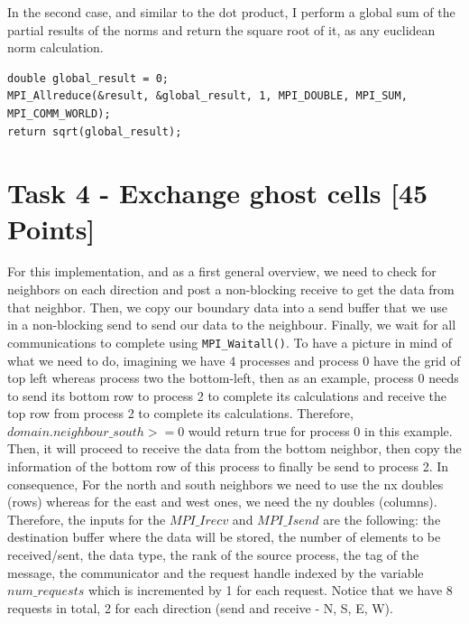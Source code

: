 \documentclass[unicode,11pt,a4paper,oneside,numbers=endperiod,openany]{scrartcl}
\begin{document}
In the second case, and similar to the dot product, I perform a global sum
of the partial results of the norms and return the square root of it, as any euclidean norm calculation.

\begin{verbatim}
double global_result = 0;
MPI_Allreduce(&result, &global_result, 1, MPI_DOUBLE, MPI_SUM, MPI_COMM_WORLD);
return sqrt(global_result);
\end{verbatim}

\section{Task 4 - Exchange ghost cells [45 Points] }

For this implementation, and as a first general overview, we need to check for neighbors on each direction and post 
a non-blocking receive to get the data from that neighbor. Then, we copy our boundary data into a send buffer that we use 
in a non-blocking send to send our data to the neighbour. Finally, we wait for all communications to complete using 
\texttt{MPI\_Waitall()}. To have a picture in mind of what we need to do, imagining we have 4 processes and process 0 have the grid of top 
left whereas process two the bottom-left, then as an example, process 0 needs to send its bottom row to process 2 to complete its calculations
and receive the top row from process 2 to complete its calculations. Therefore, $domain.neighbour\_south >= 0$ would return true for process 0 in this example.
Then, it will proceed to receive the data from the bottom neighbor, then copy the information of the bottom row of this process to finally
be send to process 2.
In consequence, For the north and south neighbors we need to use the nx doubles (rows) whereas for the east and west ones,
we need the ny doubles (columns). Therefore, the inputs for the $MPI\_Irecv$ and $MPI\_Isend$ are the following:
the destination buffer where the data will be stored, the number of elements to be received/sent, the data type, the rank of the source process,
the tag of the message, the communicator and the request handle indexed by the variable $num\_requests$ which is incremented by 1 for each request.
Notice that we have 8 requests in total, 2 for each direction (send and receive - N, S, E, W).
\end{document}
